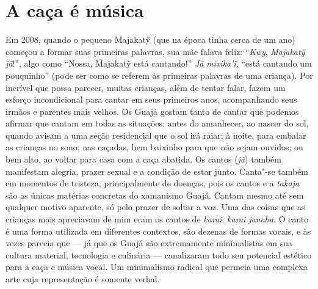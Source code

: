 \section{A caça é música}\label{a-cauxe7a-uxe9-muxfasica}

Em 2008, quando o pequeno Majakatỹ (que na época tinha cerca de um ano)
começou a formar suas primeiras palavras, sua mãe falava feliz:
``\emph{Kwy}, \emph{Majakatỹ} \emph{jã}!'', algo como ``Nossa, Majakatỹ
está cantando!'' \emph{Jã} \emph{mixika'ĩ}, ``está cantando um pouquinho''
(pode ser como se referem às primeiras palavras de uma criança). Por
incrível que possa parecer, muitas crianças, além de tentar falar, fazem
um esforço incondicional para cantar em seus primeiros anos,
acompanhando seus irmãos e parentes mais velhos. Os Guajá gostam tanto
de cantar que podemos afirmar que cantam em todas as situações: antes do
amanhecer, ao nascer do sol, quando avisam a uma seção residencial que o
sol irá raiar; à noite, para embalar as crianças no sono; nas caçadas,
bem baixinho para que não sejam ouvidos; ou bem alto, ao voltar para
casa com a caça abatida. Os cantos (\emph{jã}) também manifestam
alegria, prazer sexual e a condição de estar junto. Canta"-se também em
momentos de tristeza, principalmente de doenças, pois os cantos e a
\emph{takaja} são as únicas matérias concretas do xamanismo Guajá.
Cantam mesmo até sem qualquer motivo aparente, só pelo prazer de soltar
a voz. Uma das coisas que as crianças mais apreciavam de mim eram os
cantos de \emph{karai}: \emph{karai janaha}. O canto é uma forma
utilizada em diferentes contextos, são dezenas de formas vocais, e às
vezes parecia que --- já que os Guajá são extremamente minimalistas em sua
cultura material, tecnologia e culinária --- canalizaram todo seu
potencial estético para a caça e música vocal. Um minimalismo radical
que permeia uma complexa arte cuja representação é somente verbal.

